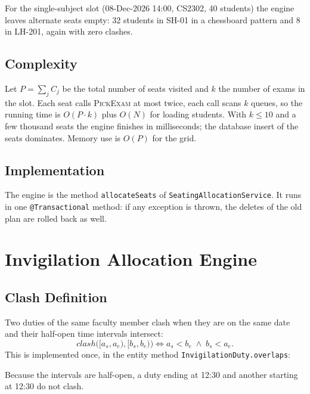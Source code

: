 \documentclass[11pt,a4paper]{article}
\newcommand{\src}{../../src/main/java/com/examgrid}
\begin{document}
For the single-subject slot (08-Dec-2026 14:00, CS2302, 40 students) the engine leaves alternate seats empty: 32 students in SH-01 in a chessboard pattern and 8 in LH-201, again with zero clashes.

\subsection{Complexity}
Let $P = \sum_j C_j$ be the total number of seats visited and $k$ the number of exams in the slot. Each seat calls \textsc{PickExam} at most twice, each call scans $k$ queues, so the running time is $O(P \cdot k)$ plus $O(N)$ for loading students. With $k \le 10$ and a few thousand seats the engine finishes in milliseconds; the database insert of the seats dominates. Memory use is $O(P)$ for the grid.

\subsection{Implementation}
The engine is the method \texttt{allocateSeats} of \texttt{SeatingAllocationService}. It runs in one \texttt{@Transactional} method: if any exception is thrown, the deletes of the old plan are rolled back as well.



\section{Invigilation Allocation Engine}
\subsection{Clash Definition}
Two duties of the same faculty member clash when they are on the same date and their half-open time intervals intersect:
\[
\mathit{clash}\big([a_s, a_e), [b_s, b_e)\big) \iff a_s < b_e \;\wedge\; b_s < a_e .
\]
This is implemented once, in the entity method \texttt{InvigilationDuty.overlaps}:

Because the intervals are half-open, a duty ending at 12:30 and another starting at 12:30 do not clash.
\end{document}

